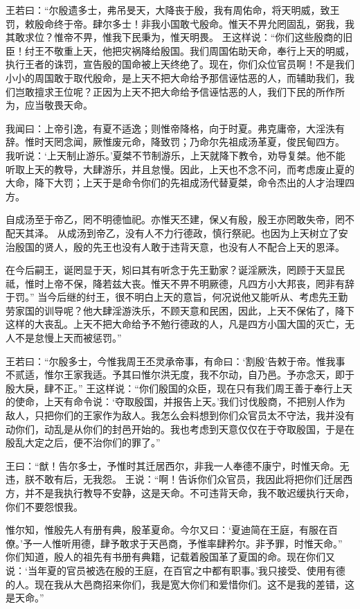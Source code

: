 \documentclass[12pt,UTF8]{ctexbook}
\begin{document}
王若曰：“尔殷遗多士，弗吊旻天，大降丧于殷，我有周佑命，将天明威，致王罚，敕殷命终于帝。肆尔多士！非我小国敢弋殷命。惟天不畀允罔固乱，弼我，我其敢求位？惟帝不畀，惟我下民秉为，惟天明畏。
王这样说：“你们这些殷商的旧臣！纣王不敬重上天，他把灾祸降给殷国。我们周国佑助天命，奉行上天的明威，执行王者的诛罚，宣告殷的国命被上天终绝了。现在，你们众位官员啊！不是我们小小的周国敢于取代殷命，是上天不把大命给予那信诬怙恶的人，而辅助我们，我们岂敢擅求王位呢？正因为上天不把大命给予信诬怙恶的人，我们下民的所作所为，应当敬畏天命。

我闻曰：上帝引逸，有夏不适逸；则惟帝降格，向于时夏。弗克庸帝，大淫泆有辞。惟时天罔念闻，厥惟废元命，降致罚；乃命尔先祖成汤革夏，俊民甸四方。
我听说：‘上天制止游乐。’夏桀不节制游乐，上天就降下教令，劝导复桀。他不能听取上天的教导，大肆游乐，并且怠慢。因此，上天也不念不问，而考虑废止夏的大命，降下大罚；上天于是命令你们的先祖成汤代替夏桀，命令杰出的人才治理四方。

自成汤至于帝乙，罔不明德恤祀。亦惟天丕建，保乂有殷，殷王亦罔敢失帝，罔不配天其泽。
从成汤到帝乙，没有人不力行德政，慎行祭祀。也因为上天树立了安治殷国的贤人，殷的先王也没有人敢于违背天意，也没有人不配合上天的恩泽。

在今后嗣王，诞罔显于天，矧曰其有听念于先王勤家？诞淫厥泆，罔顾于天显民祗，惟时上帝不保，降若兹大丧。惟天不畀不明厥德，凡四方小大邦丧，罔非有辞于罚。”
当今后继的纣王，很不明白上天的意旨，何况说他又能听从、考虑先王勤劳家国的训导呢？他大肆淫游泆乐，不顾天意和民困，因此，上天不保佑了，降下这样的大丧乱。上天不把大命给予不勉行德政的人，凡是四方小国大国的灭亡，无人不是怠慢上天而被惩罚。”

王若曰：“尔殷多士，今惟我周王丕灵承帝事，有命曰：‘割殷’告敕于帝。惟我事不贰适，惟尔王家我适。予其曰惟尔洪无度，我不尔动，自乃邑。予亦念天，即于殷大戾，肆不正。”
王这样说：“你们殷国的众臣，现在只有我们周王善于奉行上天的使命，上天有命令说：‘夺取殷国，并报告上天。’我们讨伐殷商，不把别人作为敌人，只把你们的王家作为敌人。我怎么会料想到你们众官员太不守法，我并没有动你们，动乱是从你们的封邑开始的。我也考虑到天意仅仅在于夺取殷国，于是在殷乱大定之后，便不治你们的罪了。”

王曰：“猷！告尔多士，予惟时其迁居西尔，非我一人奉德不康宁，时惟天命。无违，朕不敢有后，无我怨。
王说：“啊！告诉你们众官员，我因此将把你们迁居西方，并不是我执行教导不安静，这是天命。不可违背天命，我不敢迟缓执行天命，你们不要怨恨我。

惟尔知，惟殷先人有册有典，殷革夏命。今尔又曰：‘夏迪简在王庭，有服在百僚。’予一人惟听用德，肆予敢求于天邑商，予惟率肆矜尔。非予罪，时惟天命。”
你们知道，殷人的祖先有书册有典籍，记载着殷国革了夏国的命。现在你们又说：‘当年夏的官员被选在殷的王庭，在百官之中都有职事。’我只接受、使用有德的人。现在我从大邑商招来你们，我是宽大你们和爱惜你们。这不是我的差错，这是天命。”
\end{document}
